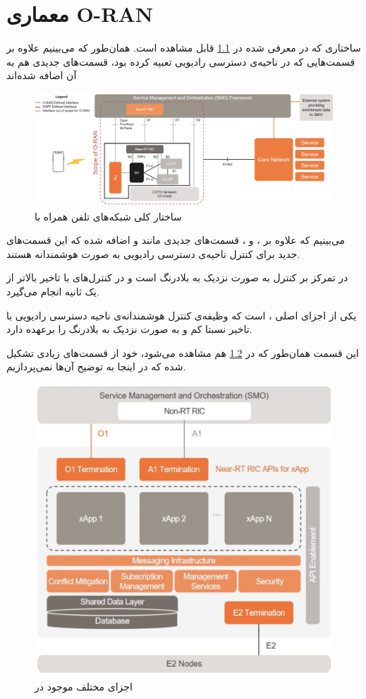 \chapter{معماری
	O-RAN
}

ساختاری که در 
معرفی شده در 
\ref{fig:oran}
قابل مشاهده است. همان‌طور که می‌بینیم علاوه بر قسمت‌هایی که 
در ناحیه‌ی دسترسی رادیویی تعبیه کرده بود، قسمت‌های جدیدی هم به آن اضافه شده‌اند 

\begin{figure}[H]
	\includegraphics[width=0.85\columnwidth]{Picture/oran.png}
	\centering
	\caption{ساختار کلی شبکه‌های تلفن همراه با
		}
	\label{fig:oran}
\end{figure}

می‌بینیم که علاوه بر 
،
و 
،
قسمت‌های جدیدی مانند 
و 
اضافه شده که این قسمت‌های جدید برای کنترل ناحیه‌ی دسترسی رادیویی به صورت هوشمندانه هستند.

در 
تمرکز بر کنترل به صورت نزدیک به بلادرنگ است و در 
کنترل‌های با تاخیر بالاتر از یک ثانیه انجام می‌گیرد. 

یکی از اجزای اصلی
،
است که وظیفه‌ی کنترل هوشمندانه‌ی ناحیه دسترسی رادیویی با تاخیر نسبتا کم و به صورت نزدیک به بلادرنگ را برعهده دارد.

این قسمت همان‌طور که در 
\ref{fig:nrt-ric0}
هم مشاهده می‌شود، خود از قسمت‌های زیادی تشکیل شده که در اینجا به توضیح آن‌ها نمی‌پردازیم.

\begin{figure}[H]
	\includegraphics[width=0.85\columnwidth]{Picture/nrt-ric0.png}
	\centering
	\caption{اجزای مختلف موجود در
		}
	\label{fig:nrt-ric0}
\end{figure}

